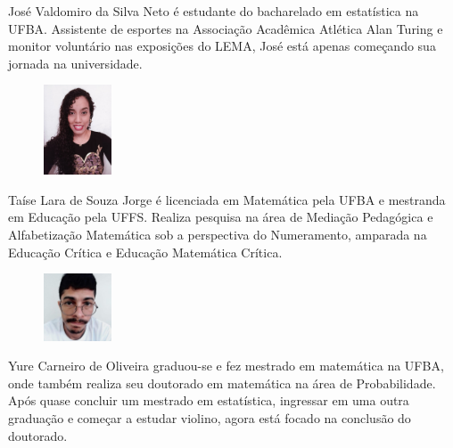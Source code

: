 \documentclass[onecolumn]{hipatia}
\begin{document}
\begin{center}
\begin{minipage}{10cm}
\begin{figure}
			\end{figure}
			José Valdomiro da Silva Neto é estudante do bacharelado em estatística na UFBA. Assistente de esportes na Associação Acadêmica Atlética Alan Turing e monitor voluntário nas exposições do LEMA, José está apenas começando sua jornada na universidade.
		\end{minipage}	
\begin{minipage}{10cm}
	\vspace{0.3cm}
	\begin{figure}
		\vspace{-10pt}
		\centering
		\includegraphics[width=2cm]{Taise.jpg}
	\end{figure}
	Taíse Lara de Souza Jorge é licenciada em Matemática pela UFBA 
	e mestranda em Educação pela UFFS. Realiza pesquisa na área de Mediação
	Pedagógica e Alfabetização Matemática sob a perspectiva do Numeramento, 
	amparada na Educação Crítica e Educação Matemática Crítica. 
\end{minipage}
\begin{minipage}{10cm}
	\vspace{0.3cm}
	\begin{figure}
		\vspace{-10pt}
		\centering
		\includegraphics[width=2cm]{yure.jpeg}
	\end{figure}
	Yure Carneiro de Oliveira graduou-se e fez mestrado em matemática na UFBA, onde também realiza seu doutorado em matemática na área de Probabilidade. Após quase concluir um mestrado em estatística, ingressar em uma outra graduação e começar a estudar violino, agora está focado na conclusão do doutorado.
\end{minipage}

\end{center}



\newpage
\end{document}
